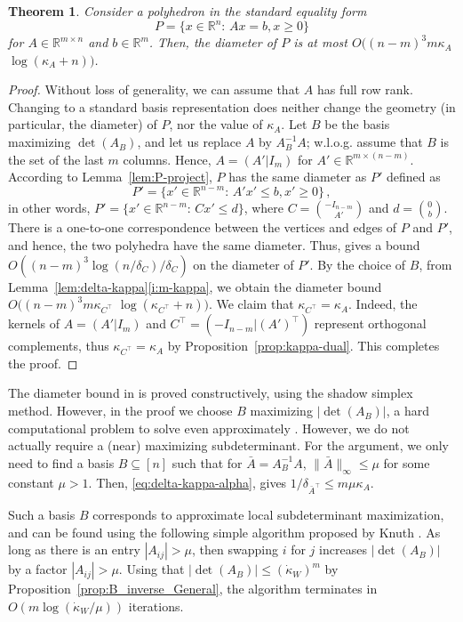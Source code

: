 \documentclass[11pt, a4paper]{article}
\newcommand{\1}{\mathbbm{1}}
\newcommand{\kd}{{\dot{\kappa}}}
\newtheorem{theorem}{Theorem}[section]
\theoremstyle{case}
\newcommand{\R}{\mathbb{R}}
\begin{document}
\begin{theorem}\label{thm:kappa-diameter}
Consider a polyhedron in the standard equality form 
\[P=\{x\in\R^n:\, Ax=b, x\ge 0\}\]
for $A\in\R^{m\times n}$ and $b\in \R^m$. Then, the diameter of $P$ is at most  $O((n-m)^{3} m \kappa_{A}$ $\log(\kappa_{A}+n))$.
\end{theorem}
\begin{proof}
Without loss of generality, we can assume that $A$ has full row rank. Changing to a standard basis representation does neither change the geometry (in particular, the diameter) of $P$, nor the value of $\kappa_A$.
Let $B$ be the basis maximizing $\det(A_B)$, and let us replace $A$ by $A_B^{-1} A$; w.l.o.g. assume that $B$ is the set of the last $m$ columns.
 Hence, $A=(A'|I_m)$ for $A'\in \R^{m\times (n-m)}$. 
According to Lemma~\ref{lem:P-project}, $P$ has the same diameter as $P'$ defined as
\[P'=\{x'\in\R^{n-m}:\, A'x'\le b, x'\ge 0\}\, ,\]
in other words, $P'=\{x'\in\R^{n-m}:\, Cx'\le d\}$, where $C={-I_{n-m}\choose A'}$ and $d={0 \choose b}$. There is a one-to-one correspondence between the vertices and edges of $P$ and $P'$, and hence, the two polyhedra have the same diameter.
Thus, \cite{dadush2016shadow} gives a bound $O((n-m)^3\log(n/\delta_C)/\delta_C)$ on the diameter of $P'$.
By the choice of $B$, from Lemma~\ref{lem:delta-kappa}\ref{i:m-kappa}, we obtain the diameter bound
 $O((n-m)^{3}m\kappa_{C^\top}$ $\log(\kappa_{C^\top}+n))$.
We claim that $\kappa_{C^\top}=\kappa_A$. Indeed, the kernels of $A=(A'|I_m)$ and $C^\top=(-I_{n-m}|(A')^\top)$ represent orthogonal complements, thus $\kappa_{C^\top}=\kappa_A$ by Proposition~\ref{prop:kappa-dual}. This completes the proof.
\end{proof}

The diameter bound in \cite{dadush2016shadow} is proved constructively, using the shadow simplex method. However, in the proof we choose $B$ maximizing $|\det(A_B)|$, a hard computational problem to solve even approximately \cite{DiSumma2014}. 
However, we do not actually require a (near) maximizing subdeterminant. For the argument, we only need to find a basis $B\subseteq [n]$ such that for $\bar A=A_B^{-1}A$, $\|\bar A\|_\infty\le \mu$ for some constant $\mu>1$. 
Then,  \eqref{eq:delta-kappa-alpha}, gives $1/\delta_{\bar A^\top}\le m\mu\kappa_A$.

Such a basis $B$ corresponds to  approximate local subdeterminant maximization, and 
 can be found using the following simple algorithm proposed by Knuth \cite{Knuth1985}. As long as there is an entry $|A_{ij}|>\mu$, then swapping $i$ for $j$ increases $|\det(A_B)|$ by a factor $|A_{ij}|>\mu$. 
Using that $|\det(A_B)|\le (\kd_W)^m$ by Proposition~\ref{prop:B_inverse_General}, the algorithm terminates in $O(m\log(\kd_W/\mu))$ iterations.
\end{document}
